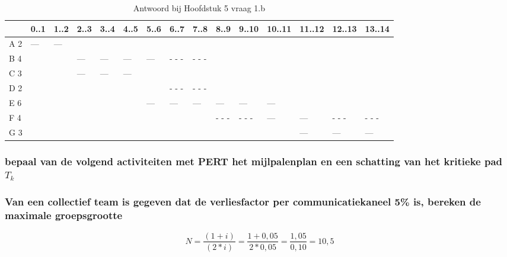 \documentclass[a4paper,titlepage]{artikel1}
\begin{document}
   \begin{table}
     \caption{Antwoord bij Hoofdstuk 5 vraag 1.b} \label{r51b}
       \begin{tabular}[htb]{|l|l|l|l|l|l|l|l|l|l|l|l|l|l|l|}
         \hline
             & 0..1 & 1..2 & 2..3 & 3..4 & 4..5 & 5..6 & 6..7 & 7..8 & 8..9 & 9..10 & 10..11 & 11..12 & 12..13 & 13..14 \\
         \hline
         A 2 &  --- &  --- &      &      &      &      &      &      &      &       &        &        &        &\\
         \hline
         B 4 &      &      &  --- & ---  & ---  & ---  & - - -& - - -&      &       &        &        &        &\\
         \hline
         C 3 &      &      &  --- & ---  & ---  &      &      &      &      &       &        &        &        &\\
         \hline
         D 2 &      &      &      &      &      &      & - - -& - - -&      &       &        &        &        &\\
         \hline
         E 6 &      &      &      &      &      & ---  & ---  & ---  & ---  & ---   & ---    &        &        &\\
         \hline     
         F 4 &      &      &      &      &      &      &      &      & - - -& - - - & ---    & ---    & - - -  & - - -\\
         \hline
         G 3 &      &      &      &      &      &      &      &      &      &       &        & ---    & ---    & ---\\
         \hline
       \end{tabular}
   \end{table}
   
   \subsubsection[Opdracht 2]{bepaal van de volgend activiteiten met PERT het mijlpalenplan en een schatting van het kritieke pad $T_k$}

   \subsubsection[Opdracht 3]{Van een collectief team is gegeven dat de verliesfactor per communicatiekaneel 5\% is, bereken de maximale groepsgrootte}
   \begin{displaymath}
     N=\frac{(1+i)}{(2*i)}=\frac{1+0,05}{2*0,05}=\frac{1,05}{0,10}=10,5
   \end{displaymath}
\end{document}
